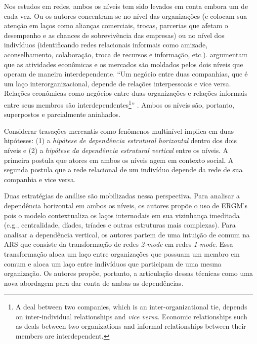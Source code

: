 \documentclass[a4paper, 12pt, openright, oneside, german, french, english, brazil]{abntex2}
\begin{document}
	Nos estudos em redes, ambos os níveis tem sido levados em conta embora um de cada vez. Ou os autores concentram-se no nível das organizações (e colocam sua atenção em laços como alianças comerciais, trocas, parcerias que afetam o desempenho e as chances de sobrevivência das empresas) ou no nível dos indivíduos (identificando redes relacionais informais como amizade, aconselhamento, colaboração, troca de recursos e informação, etc.).  argumentam que as atividades econômicas e os mercados são moldados pelos dois níveis que operam de maneira interdependente. ``Um negócio entre duas companhias, que é um laço interorganizacional, depende de relações interpessoais e vice versa. Relações econômicas como negócios entre duas organizações e relações informais entre seus membros são interdependentes\footnote{A deal between two companies, which is an inter-organizational tie, depends on inter-individual relationships and \textit{vice versa}. Economic relationships such as deals between two organizations and informal relationships between their members are interdependent.}'' \cite[p. 246]{brailly2016market}. Ambos os níveis são, portanto, superpostos e parcialmente aninhados.
	
	Considerar trasações mercantis como fenômenos multinível implica em duas hipóteses: (1) a \textit{hipótese de dependência estrutural horizontal} dentro dos dois níveis e (2) a \textit{hipótese da dependência estrutural vertical} entre os níveis. A primeira postula que atores em ambos os níveis agem em contexto social. A segunda postula que a rede relacional de um indivíduo depende da rede de sua companhia e vice versa.
	
	Duas estratégias de análise são mobilizadas nessa perspectiva. Para analisar a dependência horizontal em ambos os níveis, os autores propõe o uso de ERGM's pois o modelo contextualiza os laços internodais em sua vizinhança imeditada (e.g., centralidade, díades, tríades e outras estruturas mais complexas). Para analisar a dependência vertical, os autores partem de uma intuição de comum na ARS que consiste da transformação de redes \textit{2-mode} em redes \textit{1-mode}. Essa transformação aloca um laço entre organizações que possuam um membro em comum e aloca um laço entre indivíduos que participam de uma mesma organização. Os autores propõe, portanto, a articulação dessas técnicas como uma nova abordagem para dar conta de ambas as dependências.
	
	
	
\end{document}
